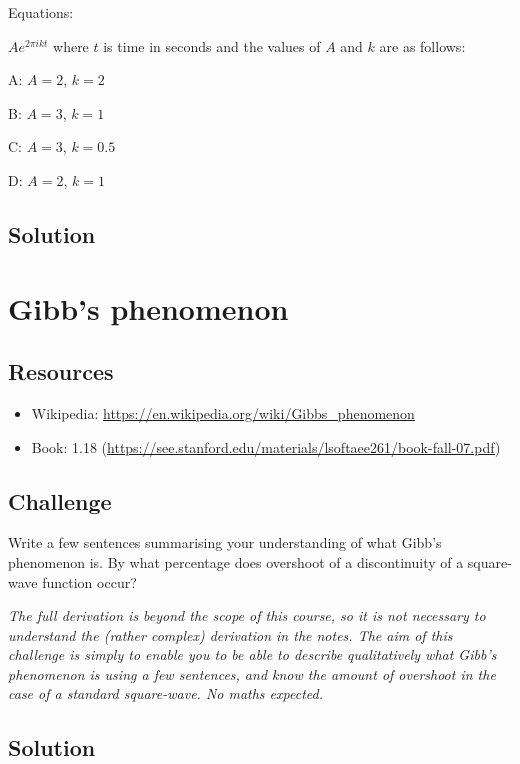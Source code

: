 Equations:

$\displaystyle A e^{2 \pi i k t}$ where $t$ is time in seconds and the values of $A$ and $k$ are as follows:

A: $A=2$, $k=2$ 

B: $A=3$, $k=1$

C: $A=3$, $k=0.5$

D: $A=2$, $k=1$

\subsection*{Solution}
\six{}





\newpage
\section{Gibb's phenomenon}

\subsection*{Resources}
\begin{itemize}
    \item Wikipedia: \url{https://en.wikipedia.org/wiki/Gibbs_phenomenon}
    \item Book: 1.18 (\url{https://see.stanford.edu/materials/lsoftaee261/book-fall-07.pdf})
\end{itemize}

\subsection*{Challenge}
Write a few sentences summarising your understanding of what Gibb's phenomenon is. By what percentage does overshoot of a discontinuity of a square-wave function occur?

\emph{The full derivation is beyond the scope of this course, so it is not necessary to understand the (rather complex) derivation in the notes. The aim of this challenge is simply to enable you to be able to describe qualitatively what Gibb's phenomenon is using a few sentences, and know the amount of overshoot in the case of a standard square-wave. No maths expected.}

\subsection*{Solution}
\six{\%}









